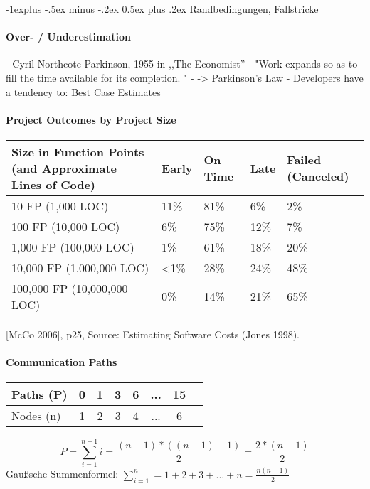 \documentclass[a4paper]{article}
\makeatletter
\renewcommand{\subsection}{\@startsection{subsection}{2}{0mm}%
                                {-1explus -.5ex minus -.2ex}%
                                {0.5ex plus .2ex}%
                                {\normalfont\normalsize\bfseries}}
\makeatother
\begin{document}
\begin{multicols}{3}
  \subsection{Randbedingungen, Fallstricke}
  \paragraph{Over- / Underestimation}
  - Cyril Northcote Parkinson, 1955 in ,,The Economist''
      - "Work expands so as to fill the time available for its completion. "
  - -> Parkinson's Law
  - Developers have a tendency to: Best Case Estimates
  
  \paragraph{Project Outcomes by Project Size}
  \begin{tabular}{l|l|l|l|l}      
  Size in Function Points (and Approximate Lines of Code) & Early & On Time & Late & Failed (Canceled) \\\hline
  10 FP (1,000 LOC)                                       & 11\%   & 81\%     & 6\%   & 2\%        \\        
  100 FP (10,000 LOC)                                     & 6\%    & 75\%     & 12\%  & 7\%         \\       
  1,000 FP (100,000 LOC)                                  & 1\%    & 61\%     & 18\%  & 20\%           \\    
  10,000 FP (1,000,000 LOC)                               & <1\%   & 28\%     & 24\%  & 48\%        \\       
  100,000 FP (10,000,000 LOC)                             & 0\%    & 14\%     & 21\%  & 65\%               
  \end{tabular}
  
  [McCo 2006], p25, Source: Estimating Software Costs (Jones 1998).
  
  
  \paragraph{Communication Paths}
  \begin{tabular}{l|c|c|c|c|c|c|c}
  Paths (P) & 0   & 1  & 3   & 6   & ... & 15  \\\hline
  Nodes (n) & 1  & 2   & 3   & 4   & ... & 6 
  \end{tabular}
  
  $$P=\sum_{i=1}^{n-1} i=\frac{(n-1)*((n-1)+1)}{2}=\frac{2*(n-1)}{2}$$
  Gaußsche Summenformel: $\sum_{i=1}^n = 1+2+3+...+n=\frac{n(n+1)}{2}$
  

\end{multicols}
\end{document}
